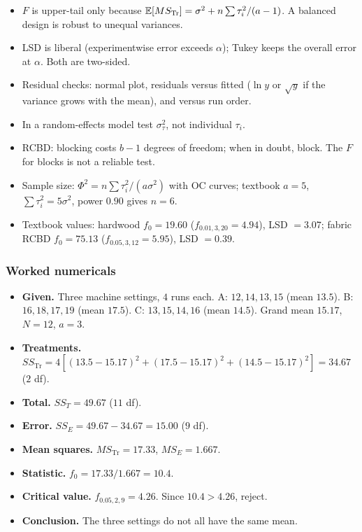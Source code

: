 \begin{notebox}
\begin{itemize}
  \item $F$ is upper-tail only because $\mathbb{E}[MS_{\text{Tr}}]=\sigma^2+n\sum\tau_i^2/(a-1)$. A balanced design is robust to unequal variances.
  \item LSD is liberal (experimentwise error exceeds $\alpha$); Tukey keeps the overall error at $\alpha$. Both are two-sided.
  \item Residual checks: normal plot, residuals versus fitted ($\ln y$ or $\sqrt{y}$ if the variance grows with the mean), and versus run order.
  \item In a random-effects model test $\sigma_\tau^2$, not individual $\tau_i$.
  \item RCBD: blocking costs $b-1$ degrees of freedom; when in doubt, block. The $F$ for blocks is not a reliable test.
  \item Sample size: $\Phi^2=n\sum\tau_i^2/(a\sigma^2)$ with OC curves; textbook $a=5$, $\sum\tau_i^2=5\sigma^2$, power $0.90$ gives $n=6$.
  \item Textbook values: hardwood $f_0=19.60$ ($f_{0.01,3,20}=4.94$), LSD $=3.07$; fabric RCBD $f_0=75.13$ ($f_{0.05,3,12}=5.95$), LSD $=0.39$.
\end{itemize}
\end{notebox}

\subsubsection*{Worked numericals}

\begin{example}
\begin{itemize}
  \item \textbf{Given.} Three machine settings, $4$ runs each. A: $12,14,13,15$ (mean $13.5$). B: $16,18,17,19$ (mean $17.5$). C: $13,15,14,16$ (mean $14.5$). Grand mean $15.17$, $N=12$, $a=3$.
  \item \textbf{Treatments.} $SS_{\text{Tr}}=4[(13.5-15.17)^2+(17.5-15.17)^2+(14.5-15.17)^2]=34.67$ ($2$ df).
  \item \textbf{Total.} $SS_T=49.67$ ($11$ df).
  \item \textbf{Error.} $SS_E=49.67-34.67=15.00$ ($9$ df).
  \item \textbf{Mean squares.} $MS_{\text{Tr}}=17.33$, $MS_E=1.667$.
  \item \textbf{Statistic.} $f_0=17.33/1.667=10.4$.
  \item \textbf{Critical value.} $f_{0.05,2,9}=4.26$. Since $10.4>4.26$, reject.
  \item \textbf{Conclusion.} The three settings do not all have the same mean.
\end{itemize}
\end{example}

